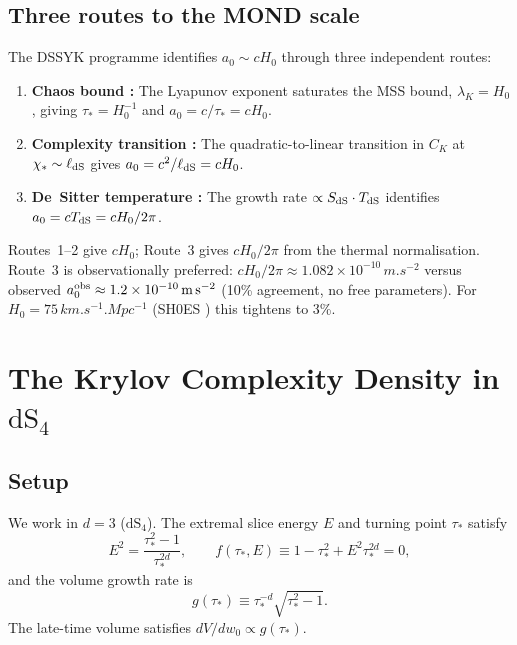 \documentclass[a4paper,11pt]{article}
\newcommand{\tausk}{\tau_*}                          %
\newcommand{\az}{a_0}                                %
\newcommand{\elldS}{\ell_{\rm dS}}                   %
\newcommand{\TdS}{T_{\rm dS}}                        %
\newcommand{\SdS}{S_{\rm dS}}                        %
\newcommand{\dS}[1]{\mathrm{dS}_{#1}}               %
\begin{document}
\subsection{Three routes to the MOND scale}
\label{sec:three_routes}

The DSSYK programme identifies $\az\sim cH_0$ through three independent
routes:

\begin{enumerate}
  \item \textbf{Chaos bound \cite{Aguilar:2024}:}
    The Lyapunov exponent saturates the MSS bound, $\lambda_K=H_0$, giving
    $\tau_*=H_0^{-1}$ and $\az=c/\tau_*=cH_0$.

  \item \textbf{Complexity transition \cite{Heller:2025}:}
    The quadratic-to-linear transition in $C_K$ at
    $\chi_*\sim\elldS$ gives $\az=c^2/\elldS=cH_0$.

  \item \textbf{De~Sitter temperature \cite{Heller:2025}:}
    The growth rate $\propto\SdS\cdot\TdS$ identifies $\az = c\TdS =
    cH_0/2\pi$.
\end{enumerate}

Routes~1--2 give $cH_0$; Route~3 gives $cH_0/2\pi$ from the thermal
normalisation.  Route~3 is observationally preferred:
$cH_0/2\pi\approx1.082\times10^{-10}\,\si{m.s^{-2}}$ versus observed
$\az^{\rm obs}\approx1.2\times10^{-10}\,\si{m.s^{-2}}$ (10\% agreement,
no free parameters).  For $H_0=75\,\si{km.s^{-1}.Mpc^{-1}}$ (SH0ES
\cite{Riess:2022}) this tightens to 3\%.

\section{The Krylov Complexity Density in $\dS{4}$}
\label{sec:density}

\subsection{Setup}

We work in $d=3$ ($\dS{4}$).  The extremal slice energy $E$ and turning
point $\tausk$ satisfy
\begin{equation}
  E^2 = \frac{\tausk^2-1}{\tausk^{2d}}, \qquad
  f(\tausk,E) \equiv 1-\tausk^2+E^2\tausk^{2d} = 0,
  \label{eq:constraint}
\end{equation}
and the volume growth rate is
\begin{equation}
  g(\tausk) \equiv \tausk^{-d}\sqrt{\tausk^2-1}.
  \label{eq:growth}
\end{equation}
The late-time volume satisfies $dV/dw_0\propto g(\tausk)$.
\end{document}
